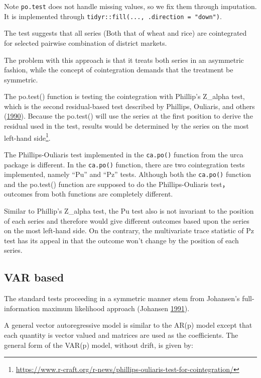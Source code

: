 \documentclass[
  12pt,
]{article}
\begin{document}
Note \texttt{po.test} does not handle missing values, so we fix them through imputation. It is implemented through \texttt{tidyr::fill(...,\ .direction\ =\ "down")}.

The test suggests that all series (Both that of wheat and rice) are cointegrated for selected pairwise combination of district markets.

The problem with this approach is that it treats both series in an asymmetric fashion, while the concept of cointegration demands that the treatment be symmetric.

The po.test() function is testing the cointegration with Phillip's Z\_alpha test, which is the second residual-based test described by Phillips, Ouliaris, and others (\protect\hyperlink{ref-phillips1990asymptotic}{1990}). Because the po.test() will use the series at the first position to derive the residual used in the test, results would be determined by the series on the most left-hand side\footnote{\url{https://www.r-craft.org/r-news/phillips-ouliaris-test-for-cointegration/}}.

The Phillips-Ouliaris test implemented in the \texttt{ca.po()} function from the urca package is different. In the \texttt{ca.po()} function, there are two cointegration tests implemented, namely ``Pu'' and ``Pz'' tests. Although both the \texttt{ca.po()} function and the po.test() function are supposed to do the Phillips-Ouliaris test，outcomes from both functions are completely different.

Similar to Phillip's Z\_alpha test, the Pu test also is not invariant to the position of each series and therefore would give different outcomes based upon the series on the most left-hand side. On the contrary, the multivariate trace statistic of Pz test has its appeal in that the outcome won't change by the position of each series.

\hypertarget{var-based}{%
\subsection{VAR based}\label{var-based}}

The standard tests proceeding in a symmetric manner stem from Johansen's full-information maximum likelihood approach (Johansen \protect\hyperlink{ref-johansen1991estimation}{1991}).

A general vector autoregressive model is similar to the AR(p) model except that each quantity is vector valued and matrices are used as the coefficients. The general form of the VAR(p) model, without drift, is given by:
\end{document}
